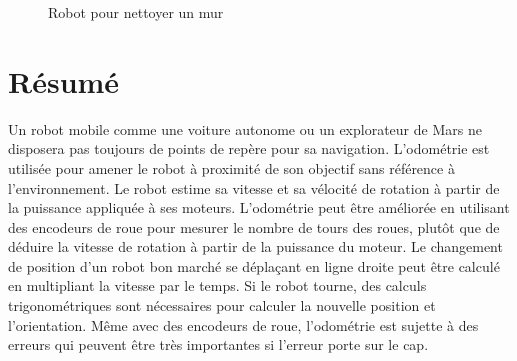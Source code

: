 \begin{figure}
\begin{center}
\end{center}
\caption{Robot pour nettoyer un mur}\label{fig.wallcleaning}
\end{figure}

\section{Résumé}

Un robot mobile comme une voiture autonome ou un explorateur de Mars ne disposera pas toujours de points de repère pour sa navigation. L'odométrie est utilisée pour amener le robot à proximité de son objectif sans référence à l'environnement. Le robot estime sa vitesse et sa vélocité de rotation à partir de la puissance appliquée à ses moteurs. L'odométrie peut être améliorée en utilisant des encodeurs de roue pour mesurer le nombre de tours des roues, plutôt que de déduire la vitesse de rotation à partir de la puissance du moteur. Le changement de position d'un robot bon marché se déplaçant en ligne droite peut être calculé en multipliant la vitesse par le temps. Si le robot tourne, des calculs trigonométriques sont nécessaires pour calculer la nouvelle position et l'orientation. Même avec des encodeurs de roue, l'odométrie est sujette à des erreurs qui peuvent être très importantes si l'erreur porte sur le cap.

